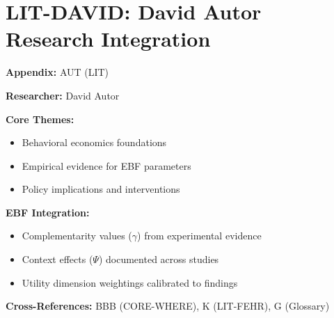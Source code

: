 %
%

\chapter{LIT-DAVID: David Autor Research Integration}
\label{app:aut}

\begin{abstract}
This appendix integrates the research contributions of David Autor into the
Evidence-Based Framework. It documents key papers, core findings, and their
integration with EBF dimensions including complementarity parameters ($\gamma$),
context factors ($\Psi$), and utility dimensions.
\end{abstract}

\begin{tcolorbox}[colback=blue!5!white, colframe=blue!75!black,
    title=Quick Reference: David Autor Research]

\textbf{Appendix:} AUT (LIT)

\textbf{Researcher:} David Autor

\textbf{Core Themes:}
\begin{itemize}[nosep]
\item Behavioral economics foundations
\item Empirical evidence for EBF parameters
\item Policy implications and interventions
\end{itemize}

\textbf{EBF Integration:}
\begin{itemize}[nosep]
\item Complementarity values ($\gamma$) from experimental evidence
\item Context effects ($\Psi$) documented across studies
\item Utility dimension weightings calibrated to findings
\end{itemize}

\textbf{Cross-References:} BBB (CORE-WHERE), K (LIT-FEHR), G (Glossary)
\end{tcolorbox}

